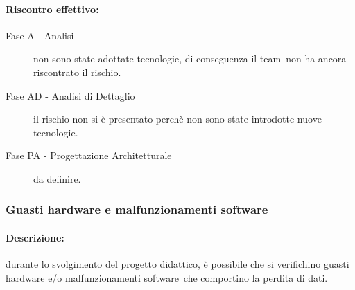 \documentclass[../PianoProgetto.tex]{subfiles}
\begin{document}
	\paragraph*{Riscontro effettivo:} 
		\begin{description}
			\item[Fase A - Analisi] non sono state adottate tecnologie, di conseguenza il team\g\ non ha ancora riscontrato il rischio.
			\item[Fase AD - Analisi di Dettaglio] il rischio non si è presentato perchè non sono state introdotte nuove tecnologie.
			\item[Fase PA - Progettazione Architetturale] da definire.
		\end{description}


	\subsubsection{Guasti hardware e malfunzionamenti software}
	\label{sec:Guasti hardware e malfunzionamenti software}
	
	\paragraph*{Descrizione:} durante lo svolgimento del progetto didattico, è possibile che si verifichino guasti hardware e/o malfunzionamenti software\g\ che comportino la perdita di dati.
	
	
\end{document}
